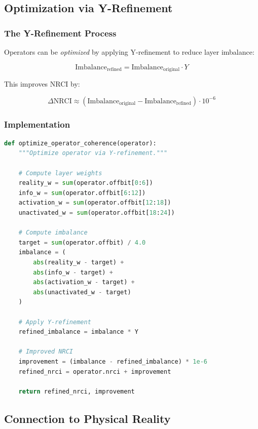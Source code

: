 \subsection{Optimization via Y-Refinement}

\subsubsection{The Y-Refinement Process}

Operators can be \emph{optimized} by applying Y-refinement to reduce layer imbalance:

\begin{equation}
\text{Imbalance}_{\text{refined}} = \text{Imbalance}_{\text{original}} \cdot Y
\end{equation}

This improves NRCI by:

\begin{equation}
\Delta \text{NRCI} \approx (\text{Imbalance}_{\text{original}} - \text{Imbalance}_{\text{refined}}) \cdot 10^{-6}
\end{equation}

\subsubsection{Implementation}

\begin{lstlisting}[language=Python, caption=Y-Refinement Optimization]
def optimize_operator_coherence(operator):
    """Optimize operator via Y-refinement."""
    
    # Compute layer weights
    reality_w = sum(operator.offbit[0:6])
    info_w = sum(operator.offbit[6:12])
    activation_w = sum(operator.offbit[12:18])
    unactivated_w = sum(operator.offbit[18:24])
    
    # Compute imbalance
    target = sum(operator.offbit) / 4.0
    imbalance = (
        abs(reality_w - target) +
        abs(info_w - target) +
        abs(activation_w - target) +
        abs(unactivated_w - target)
    )
    
    # Apply Y-refinement
    refined_imbalance = imbalance * Y
    
    # Improved NRCI
    improvement = (imbalance - refined_imbalance) * 1e-6
    refined_nrci = operator.nrci + improvement
    
    return refined_nrci, improvement
\end{lstlisting}

\subsection{Connection to Physical Reality}


